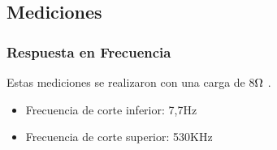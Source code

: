 \subsection{Mediciones}
\bigskip
\subsubsection{Respuesta en Frecuencia}
Estas mediciones se realizaron con una carga de 8$\ohm$ .
\begin{itemize}
\item Frecuencia de corte inferior: 7,7Hz
\item Frecuencia de corte superior: 530KHz
\end{itemize}


